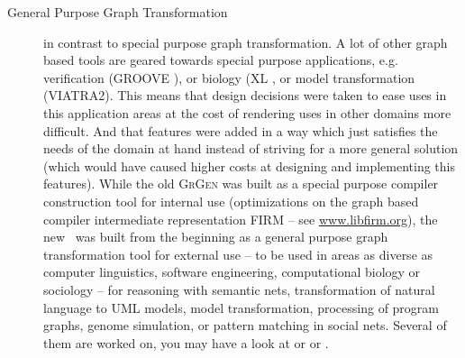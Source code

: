 \begin{description}
\item[General Purpose Graph Transformation]
in contrast to special purpose graph transformation.
A lot of other graph based tools are geared towards special purpose applications, 
e.g. verification (GROOVE \cite{Groove}), or biology (XL \cite{xl}, or model transformation (VIATRA2\cite{viatra2}).
This means that design decisions were taken to ease uses in this application areas at the cost of rendering uses in other domains more difficult.
And that features were added in a way which just satisfies the needs of the domain at hand instead of striving for a more general solution 
(which would have caused higher costs at designing and implementing this features).
While the old \textsc{GrGen} was built as a special purpose compiler construction tool for internal use 
(optimizations on the graph based compiler intermediate representation FIRM -- see \url{www.libfirm.org}), 
the new \GrG\ was built from the beginning as a general purpose graph transformation tool for external use
-- to be used in areas as diverse as computer linguistics, software engineering, computational biology or sociology --
for reasoning with semantic nets, transformation of natural language to UML models,
model transformation, processing of program graphs, genome simulation, or pattern matching in social nets. 
Several of them are worked on, you may have a look at \cite{usecomputerlinguistics} or \cite{usemodeltransformation} or \cite{usegeneexpression}.

\end{description}
